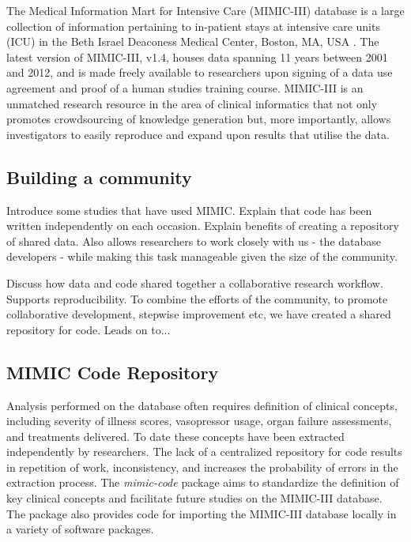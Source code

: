 \documentclass{bioinfo}
\begin{document}

The Medical Information Mart for Intensive Care (MIMIC-III) database is a large collection of information pertaining to in-patient stays at intensive care units (ICU) in the Beth Israel Deaconess Medical Center, Boston, MA, USA \cite{mimiciii}. The latest version of MIMIC-III, v1.4, houses data spanning 11 years between 2001 and 2012, and is made freely available to researchers upon signing of a data use agreement and proof of a human studies training course. MIMIC-III is an unmatched research resource in the area of clinical informatics that not only promotes crowdsourcing of knowledge generation but, more importantly, allows investigators to easily reproduce and expand upon results that utilise the data. 

\subsection{Building a community}


Introduce some studies that have used MIMIC. Explain that code has been written independently on each occasion. Explain benefits of creating a repository of shared data. Also allows researchers to work closely with us - the database developers - while making this task manageable given the size of the community.

Discuss how data and code shared together a collaborative research workflow. Supports reproducibility. To combine the efforts of the community, to promote collaborative development, stepwise improvement etc, we have created a shared repository for code. Leads on to...

\subsection{MIMIC Code Repository}


Analysis performed on the database often requires definition of clinical concepts, including severity of illness scores, vasopressor usage, organ failure assessments, and treatments delivered. To date these concepts have been extracted independently by researchers. The lack of a centralized repository for code results in repetition of work, inconsistency, and increases the probability of errors in the extraction process. The \emph{mimic-code} package aims to standardize the definition of key clinical concepts and facilitate future studies on the MIMIC-III database. The package also provides code for importing the MIMIC-III database locally in a variety of software packages.
\end{document}
